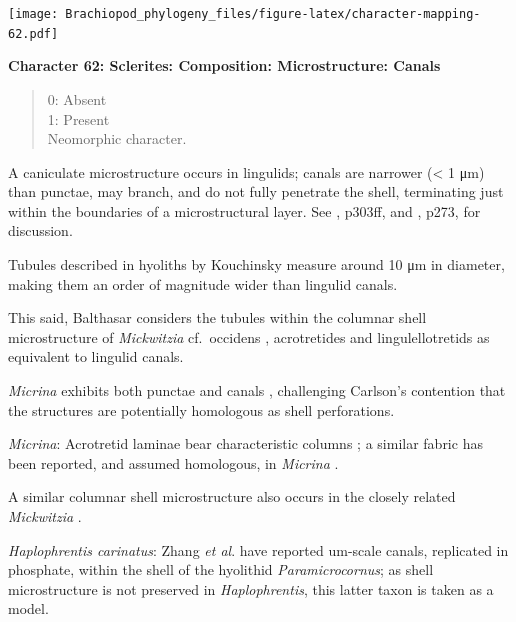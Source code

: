 \documentclass[openany]{book}
\theoremstyle{definition}
\theoremstyle{definition}
\theoremstyle{definition}
\theoremstyle{remark}
\begin{document}
\texttt{[image: Brachiopod\_phylogeny\_files/figure-latex/character-mapping-62.pdf]}

\textbf{Character 62: Sclerites: Composition: Microstructure: Canals}

\begin{quote}
0: Absent\\
1: Present\\
Neomorphic character.
\end{quote}

A caniculate microstructure occurs in lingulids; canals are narrower
(\textless{} 1 μm) than punctae, may branch, and do not fully penetrate
the shell, terminating just within the boundaries of a microstructural
layer. See \citet{Williams1997BrachiopodaRevised}, p303ff, and
\citet{Balthasar2008iMummpikia}, p273, for discussion.

Tubules described in hyoliths by Kouchinsky
\citeyearpar{Kouchinsky2000Skeletalmicrostructures} measure around 10 μm
in diameter, making them an order of magnitude wider than lingulid
canals.

This said, Balthasar \citeyearpar{Balthasar2008iMummpikia} considers the
tubules within the columnar shell microstructure of \emph{Mickwitzia}
cf.~occidens \citep[1--3 μm wide,][]{Skovsted2003EarlyCambrian},
acrotretides \citep[1 μm wide,
see][\citet{Zhang2016Epithelialcell}]{Holmer1989MiddleOrdovician} and
lingulellotretids \citep[100 nm wide,][]{Cusack1999Chemicostructural} as
equivalent to lingulid canals.

\emph{Micrina} exhibits both punctae and canals
\citep{Harper2017Brachiopodsorigin}, challenging Carlson's contention
\citep[in][]{Williams2007PartH} that the structures are potentially
homologous as shell perforations.

\emph{Micrina}: Acrotretid laminae bear characteristic columns
\citep[e.g.][]{Zhang2016Epithelialcell}; a similar fabric has been
reported, and assumed homologous, in \emph{Micrina}
\citep{Butler2012ConstructingCambrian}.

A similar columnar shell microstructure also occurs in the closely
related \emph{Mickwitzia} \citep{Balthasar2008iMummpikia}.

\emph{Haplophrentis carinatus}: Zhang \emph{et al}.
\citeyearpar{Zhang2018Ahyolithid} have reported um-scale canals,
replicated in phosphate, within the shell of the hyolithid
\emph{Paramicrocornus}; as shell microstructure is not preserved in
\emph{Haplophrentis}, this latter taxon is taken as a model.
\end{document}
